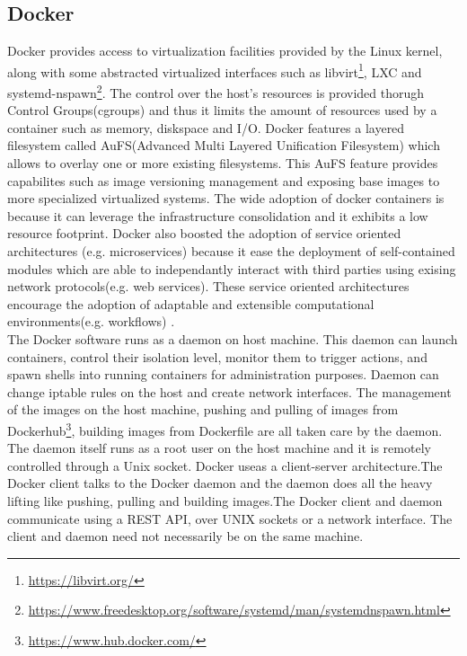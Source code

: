 \subsection{Docker}
Docker provides access to virtualization facilities provided by the Linux kernel, along with some abstracted virtualized interfaces such as libvirt\footnote{\url{https://libvirt.org/}}, LXC and systemd-nspawn\footnote{\url{https://www.freedesktop.org/software/systemd/man/systemdnspawn.html}}. The control over the host's resources is provided thorugh Control Groups(cgroups) and thus it limits the amount of resources used by a container such as memory, diskspace and I/O. Docker features a layered filesystem called AuFS(Advanced Multi Layered Unification Filesystem) which allows to overlay one or more existing filesystems. This AuFS feature provides capabilites such as image versioning management and exposing base images to more specialized virtualized systems. The wide adoption of docker containers is because it can leverage the infrastructure consolidation and it exhibits a low resource footprint. Docker also boosted the adoption of service oriented architectures (e.g. microservices) because it ease the deployment of self-contained modules which are able to independantly interact with third parties using exising network protocols(e.g. web services). These service oriented architectures encourage the adoption of adaptable and extensible computational environments(e.g. workflows) \cite{Xavier:2013:PEC:2497369.2497577}. \\

The Docker software runs as a daemon on host machine. This daemon can launch containers, control their isolation level, monitor them to trigger actions, and spawn shells into running containers for administration purposes. Daemon can change iptable rules on the host and create network interfaces. The management of the images on the host machine, pushing and pulling of images from Dockerhub\footnote{\url{https://www.hub.docker.com/}}, building images from Dockerfile are all taken care by the daemon. The daemon itself runs as a root user on the host machine and it is remotely controlled through a Unix socket. Docker useas a client-server architecture.The Docker client talks to the Docker daemon and the daemon does all the heavy lifting like pushing, pulling and building images.The Docker client and daemon communicate using a REST API, over UNIX sockets or a network interface. The client and daemon need not necessarily be on the same machine\cite{docker-documentation}.\\

